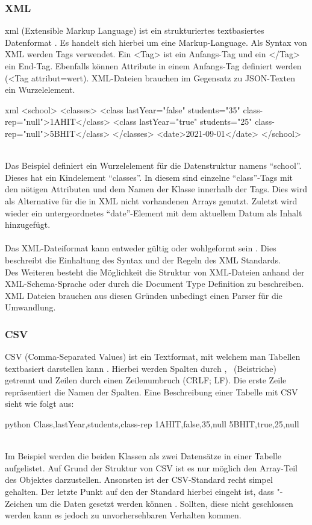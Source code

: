 		\subsubsection{XML}
		\Gls{xml} (Extensible Markup Language) ist ein strukturiertes textbasiertes Datenformat \cite{xmlStandard}. Es handelt sich hierbei um eine Markup-Language. Als Syntax von XML werden Tags verwendet. Ein <Tag> ist ein Anfangs-Tag und ein </Tag> ein End-Tag. Ebenfalls können Attribute in einem Anfangs-Tag definiert werden (<Tag attribut=\dq wert\dq ). XML-Dateien brauchen im Gegensatz zu JSON-Texten ein Wurzelelement.
		\begin{code}{xml}
		<school>
			<classes>
				<class lastYear="false" students="35" class-rep="null">1AHIT</class>
				<class lastYear="true" students="25" class-rep="null">5BHIT</class>
			</classes>
			<date>2021-09-01</date>
		</school>
		\end{code}
		\label{code:xml}~\\
		Das Beispiel definiert ein Wurzelelement für die Datenstruktur namens \enquote{school}. Dieses hat ein Kindelement \enquote{classes}. In diesem sind einzelne \enquote{class}-Tags mit den nötigen Attributen und dem Namen der Klasse innerhalb der Tags. Dies wird als Alternative für die in XML nicht vorhandenen Arrays genutzt. Zuletzt wird wieder ein untergeordnetes \enquote{date}-Element mit dem aktuellem Datum als Inhalt hinzugefügt.\\~\\
		Das XML-Dateiformat kann entweder gültig oder wohlgeformt sein \cite{xmlStandard}. Dies beschreibt die Einhaltung des Syntax und der Regeln des XML Standards.\\
		Des Weiteren besteht die Möglichkeit die Struktur von XML-Dateien anhand der XML-Schema-Sprache oder durch die Document Type Definition zu beschreiben. XML Dateien brauchen aus diesen Gründen unbedingt einen Parser für die Umwandlung.
		
		\newpage
		
		\subsubsection{CSV}
		CSV (Comma-Separated Values) ist ein Textformat, mit welchem man Tabellen textbasiert darstellen kann \cite{rfc4180}. Hierbei werden Spalten durch \dq , \dq  ~(Beistriche) getrennt und Zeilen durch einen Zeilenumbruch (CRLF; LF). Die erste Zeile repräsentiert die Namen der Spalten. Eine Beschreibung einer Tabelle mit CSV sieht wie folgt aus:
		\begin{code}{python}
			Class,lastYear,students,class-rep
			1AHIT,false,35,null
			5BHIT,true,25,null
		\end{code}
		\label{code:csv}~\\
		Im Beispiel werden die beiden Klassen als zwei Datensätze in einer Tabelle aufgelistet. Auf Grund der Struktur von CSV ist es nur möglich den Array-Teil des Objektes darzustellen. Ansonsten ist der CSV-Standard recht simpel gehalten. Der letzte Punkt auf den der Standard hierbei eingeht ist, dass "-Zeichen um die Daten gesetzt werden können \cite{rfc4180}. Sollten, diese nicht geschlossen werden kann es jedoch zu unvorhersehbaren Verhalten kommen.
